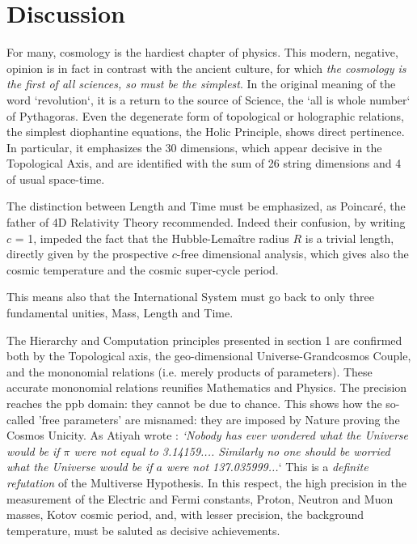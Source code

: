 \documentclass[twoside,draft]{article}
\begin{document}
\begin{sloppypar}
\section {Discussion}

For many, cosmology is the hardiest chapter of physics. This modern, negative, opinion is in fact in contrast with the ancient culture, for which \textit{the cosmology is the first of all sciences, so must be the simplest}. In the original meaning of the word `revolution`, it is a return to the source of Science, the `all is whole number` of Pythagoras. Even the degenerate form of topological or holographic relations, the simplest diophantine equations, the Holic Principle, shows direct pertinence. In particular, it emphasizes the 30 dimensions, which appear decisive in the Topological Axis, and are identified with the sum of 26 string dimensions and 4 of usual space-time.

The distinction between Length and Time must be emphasized, as
Poincar\'{e}, the father of 4D Relativity Theory recommended. Indeed their confusion, by writing $c$ =
1, impeded the fact that the Hubble-Lema\^{i}tre radius $R$ is a trivial length, directly given by the prospective $c$-free dimensional analysis, which gives also the cosmic temperature and the cosmic super-cycle period.

This means also that the International System must go back to only three fundamental unities,
Mass, Length and Time.

The Hierarchy and Computation principles presented in section 1 are confirmed both by the Topological axis, the geo-dimensional Universe-Grandcosmos Couple, and the mononomial relations (i.e. merely products of parameters). These accurate mononomial relations reunifies Mathematics and Physics. The precision reaches the ppb domain: they cannot be due to chance. This shows how the so-called 'free parameters' are misnamed: they are imposed by Nature proving the Cosmos Unicity. As Atiyah wrote \cite{Atiyah1}: \textit{`Nobody has ever wondered what the Universe would be if $\pi$ were not equal to 3.14159.... Similarly no one should be worried what the Universe would be if $a$ were not 137.035999...}` This is a \textit{definite refutation} of the Multiverse Hypothesis. In this respect, the high precision in the measurement of the Electric and Fermi constants, Proton, Neutron and Muon masses, Kotov cosmic period, and, with lesser precision, the background temperature, must be saluted as decisive achievements.


\end{sloppypar}
\end{document}
